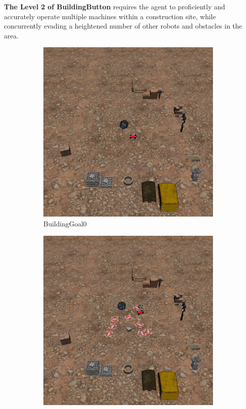 \documentclass{article}
\begin{document}
\textbf{The Level 2 of BuildingButton} requires the agent to proficiently and accurately operate multiple machines within a construction site, while concurrently evading a heightened number of other robots and obstacles in the area.
\begin{figure}[H]
    \centering
      \begin{subfigure}{0.3\linewidth}
        \centering
        \includegraphics[width=\linewidth]{assets/appendix/building_goal0.pdf}
        \caption{BuildingGoal0}
      \end{subfigure}
      \begin{subfigure}{0.3\linewidth}
        \centering
        \includegraphics[width=\linewidth]{assets/appendix/building_goal1.pdf}

\end{subfigure}
\end{figure}
\end{document}
